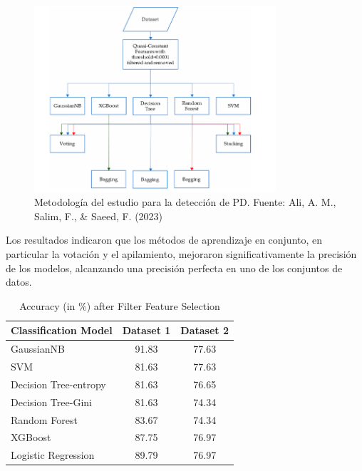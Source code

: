\documentclass[listof=nochaptergap,12pt,times,authoryear]{report}
\begin{document}
\begin{figure}[H]
    \centering
    \includegraphics[width=0.8\textwidth]{A7 - 1.png} %
    \caption{Metodología del estudio para la detección de PD. Fuente: Ali, A. M., Salim, F., & Saeed, F. (2023)}
\end{figure}


 Los resultados indicaron que los métodos de aprendizaje en conjunto, en particular la votación y el apilamiento, mejoraron significativamente la precisión de los modelos, alcanzando una precisión perfecta en uno de los conjuntos de datos.



\begin{table}[h!]
\centering
\begin{tabular}{lcc}
\toprule
\textbf{Classification Model} & \textbf{Dataset 1} & \textbf{Dataset 2} \\
\midrule
GaussianNB          & 91.83 & 77.63 \\
SVM                 & 81.63 & 77.63 \\
Decision Tree-entropy & 81.63 & 76.65 \\
Decision Tree-Gini  & 81.63 & 74.34 \\
Random Forest       & 83.67 & 74.34 \\
XGBoost             & 87.75 & 76.97 \\
Logistic Regression & 89.79 & 76.97 \\
\bottomrule
\end{tabular}
\caption{Accuracy (in \%) after Filter Feature Selection}
\label{tab:accuracy_results}
\end{table}
\end{document}
